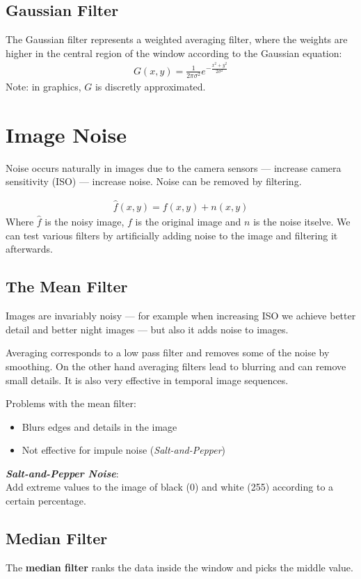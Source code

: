 \documentclass{article}
\begin{document}
\subsection{Gaussian Filter}
The Gaussian filter represents a weighted averaging filter, where the weights are higher in the central region of the window according to the Gaussian equation:
\begin{align*}
G(x,y) = \frac{1}{2\pi\sigma^2}e^{-\frac{x^2+y^2}{2\sigma^2}}
\end{align*}
Note: in graphics, $G$ is discretly approximated. 

\section{Image Noise}
Noise occurs naturally in images due to the camera sensors --- increase camera sensitivity (ISO) --- increase noise.
Noise can be removed by filtering.

\medskip
\begin{align*}
	\hat{f}(x,y) = f(x,y) + n(x,y)
\end{align*}
Where $\hat{f}$ is the noisy image, $f$ is the original image and $n$ is the noise itselve.
We can test various filters by artificially adding noise to the image and filtering it afterwards.
\subsection{The Mean  Filter}
Images are invariably noisy --- for example when increasing ISO we achieve better detail and better night images --- but also it adds noise to images.

Averaging corresponds to a low pass filter and removes some of the noise by smoothing.
On the other hand averaging filters lead to blurring and can remove small details.
It is also very effective in temporal image sequences.

Problems with the mean filter:
\begin{itemize}
	\item Blurs edges and details in the image
	\item Not effective for impule noise (\textit{Salt-and-Pepper})
\end{itemize}

\textbf{\textit{Salt-and-Pepper Noise}}:\\
Add extreme values to the image of black (0) and white (255) according to a certain percentage.

\subsection{Median Filter}
The \textbf{median filter} ranks the data inside the window and picks the middle value.
\end{document}
